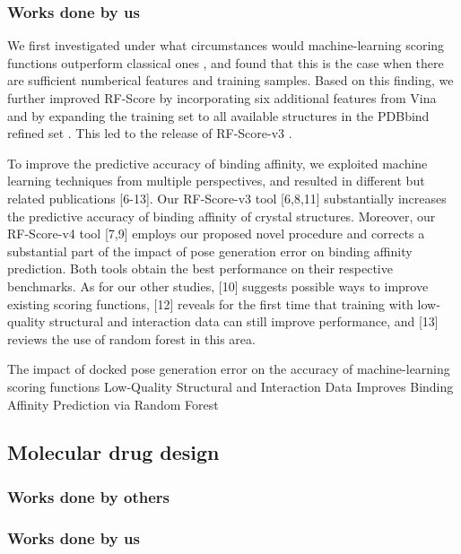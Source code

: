 \documentclass[a4paper,12pt]{article}
\begin{document}
\subsubsection*{Works done by us}

We first investigated under what circumstances would machine-learning scoring functions outperform classical ones \cite{1432}, and found that this is the case when there are sufficient numberical features and training samples. Based on this finding, we further improved RF-Score by incorporating six additional features from Vina \cite{595} and by expanding the training set to all available structures in the PDBbind refined set \cite{1633}. This led to the release of RF-Score-v3 \cite{1647}.

To improve the predictive accuracy of binding affinity, we exploited machine learning techniques from multiple perspectives, and resulted in different but related publications [6-13]. Our RF-Score-v3 tool [6,8,11] substantially increases the predictive accuracy of binding affinity of crystal structures. Moreover, our RF-Score-v4 tool [7,9] employs our proposed novel procedure and corrects a substantial part of the impact of pose generation error on binding affinity prediction. Both tools obtain the best performance on their respective benchmarks. As for our other studies, [10] suggests possible ways to improve existing scoring functions, [12] reveals for the first time that training with low-quality structural and interaction data can still improve performance, and [13] reviews the use of random forest in this area.

The impact of docked pose generation error on the accuracy of machine-learning scoring functions \cite{1434}
Low-Quality Structural and Interaction Data Improves Binding Affinity Prediction via Random Forest \cite{1663}

\subsection*{Molecular drug design}

\subsubsection*{Works done by others}


\subsubsection*{Works done by us}
\end{document}
